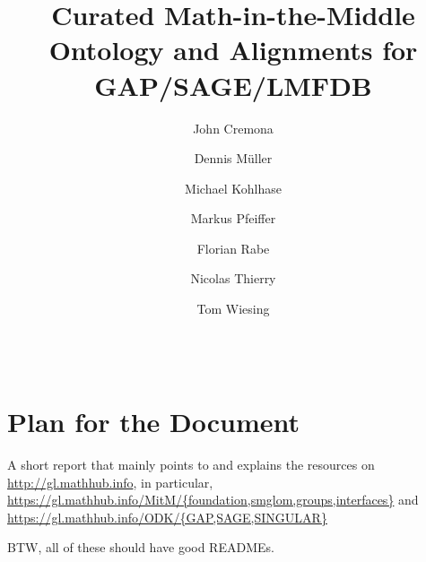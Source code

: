 \documentclass[book]{deliverablereport}
\title{Curated Math-in-the-Middle Ontology and Alignments for GAP/SAGE/LMFDB}
\author{John Cremona}
\author{Dennis M\"uller}
\author{Michael Kohlhase}
\author{Markus Pfeiffer}
\author{Florian Rabe}
\author{Nicolas Thierry}
\author{Tom Wiesing}
\begin{document}
\begin{abstract}\strut\\
\end{abstract}
\maketitle
\newpage\tableofcontents\newpage
\section{Plan for the Document}
  A short report that mainly points to and explains the resources on
  \url{http://gl.mathhub.info}, in particular,
  \url{https://gl.mathhub.info/MitM/{foundation,smglom,groups,interfaces}} and
  \url{https://gl.mathhub.info/ODK/{GAP,SAGE,SINGULAR}}

  BTW, all of these should have good READMEs.
\end{document}
